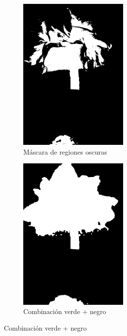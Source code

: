 

\begin{figure}[H]
\centering
\begin{subfigure}[b]{0.48\textwidth}
    \centering
    \includegraphics[width=0.6\textwidth]{imagenes/clasificador_3_negro.jpg}
    \caption{Máscara de regiones oscuras}
\end{subfigure}
\hfill
\begin{subfigure}[b]{0.48\textwidth}
    \centering
    \includegraphics[width=0.6\textwidth]{imagenes/clasificador_4_combinado.jpg}
    \caption{Combinación verde + negro}
\end{subfigure}


\end{figure}
